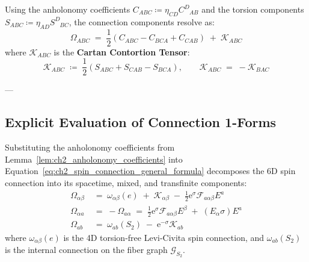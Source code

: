\documentclass[
    12pt,
    a4paper,
    headings=normal,
    twoside=false,
    open=any,
    parskip=half
]{scrbook}
\newcommand{\eu}{\mathrm{e}}
\begin{document}
Using the anholonomy coefficients $C_{ABC} \coloneqq \eta_{CD} C^D_{\phantom{D}AB}$ and the torsion components $S_{ABC} \coloneqq \eta_{AD} S^D_{\phantom{D}BC}$, the connection components resolve as:
\begin{equation}
\Omega_{ABC} \;=\; \frac{1}{2}\left( C_{ABC} - C_{BCA} + C_{CAB} \right) \;+\; \mathcal{K}_{ABC}
\label{eq:ch2_spin_connection_general_formula}
\end{equation}
where $\mathcal{K}_{ABC}$ is the \textbf{Cartan Contortion Tensor}:
\begin{equation}
\mathcal{K}_{ABC} \;\coloneqq\; \frac{1}{2}\left( S_{ABC} + S_{CAB} - S_{BCA} \right), \qquad \mathcal{K}_{ABC} \;=\; -\mathcal{K}_{BAC}
\label{eq:ch2_contortion_tensor_def}
\end{equation}

---

\subsection{Explicit Evaluation of Connection 1-Forms}

\begin{phystheorem}\label{thm:ch2_6d_spin_connection_components}
Substituting the anholonomy coefficients from Lemma~\ref{lem:ch2_anholonomy_coefficients} into Equation~\eqref{eq:ch2_spin_connection_general_formula} decomposes the 6D spin connection into its spacetime, mixed, and transfinite components:
\begin{align}
\Omega_{\alpha\beta} &\;=\; \omega_{\alpha\beta}(e) \;+\; \mathcal{K}_{\alpha\beta} \;-\; \frac{1}{2} \eu^\sigma \mathcal{F}_{a\alpha\beta} E^a \label{eq:ch2_connection_spacetime} \\
\Omega_{\alpha a} &\;=\; -\Omega_{a\alpha} \;=\; \frac{1}{2} \eu^\sigma \mathcal{F}_{a\alpha\beta} E^\beta \;+\; \left( E_\alpha \sigma \right) E^a \label{eq:ch2_connection_mixed} \\
\Omega_{ab} &\;=\; \omega_{ab}(S_2) \;-\; \eu^{-\sigma} \mathcal{K}_{ab} \label{eq:ch2_connection_fiber}
\end{align}
where $\omega_{\alpha\beta}(e)$ is the 4D torsion-free Levi-Civita spin connection, and $\omega_{ab}(S_2)$ is the internal connection on the fiber graph $\mathcal{G}_{S_2}$.
\end{phystheorem}
\end{document}
